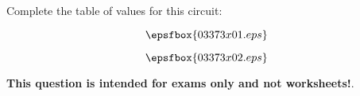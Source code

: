 

Complete the table of values for this circuit:

$$\epsfbox{03373x01.eps}$$







$$\epsfbox{03373x02.eps}$$







{\bf This question is intended for exams only and not worksheets!}.




